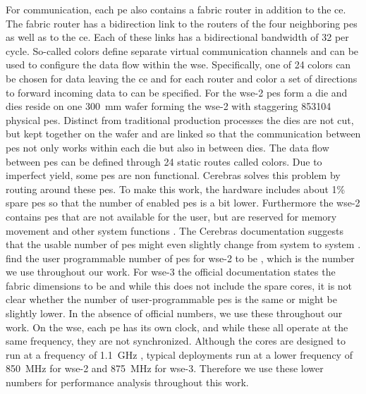 For communication, each \ac{pe} also contains a fabric router in addition to the \ac{ce}. The fabric router has a bidirection link to the routers of the four neighboring \acp{pe} as well as to the \ac{ce}. Each of these links has a bidirectional bandwidth of \qty{32}{\bit} per cycle. So-called colors define separate virtual communication channels and can be used to configure the data flow within the \ac{wse}. Specifically, one of 24 colors can be chosen for data leaving the \ac{ce} and for each router and color a set of directions to forward incoming data to can be specified. For the \ac{wse}-2  \acp{pe} form a die and  dies reside on one \qty{300}{\mm} wafer forming the \ac{wse}-2 with staggering \num{853104} physical \acp{pe}. Distinct from traditional production processes the dies are not cut, but kept together on the wafer and are linked so that the communication between \acp{pe} not only works within each die but also in between dies.
The data flow between \acp{pe} can be defined through 24 static routes called colors.\cite{lie2023cerebras}
Due to imperfect yield, some \acp{pe} are non functional.
Cerebras solves this problem by routing around these \acp{pe}. 
To make this work, the hardware includes about 1\% spare \acp{pe} so that the number of enabled \acp{pe} is a bit lower. Furthermore the \ac{wse}-2 contains \acp{pe} that are not available for the user, but are reserved for memory movement and other system functions \cite{tramm2024efficient}.
The Cerebras documentation suggests that the usable number of \acp{pe} might even slightly change from system to system \cite{cerebras_gemv_tutorial}. \citeauthor{tramm2024efficient} \cite{tramm2024efficient} find the user programmable number of \acp{pe} for \ac{wse}-2 to be , which is the number we use throughout our work. For \ac{wse}-3 the official documentation states the fabric dimensions to be  and while this does not include the spare cores, it is not clear whether the number of user-programmable \acp{pe} is the same or might be slightly lower. In the absence of official numbers, we use these throughout our work. On the \ac{wse}, each \ac{pe} has its own clock, and while these all operate at the same frequency, they are not synchronized. Although the cores are designed to run at a frequency of \qty{1.1}{\giga\hertz} \cite{lie2023cerebras}, typical deployments run at a lower frequency of \qty{850}{\mega\hertz} for \ac{wse}-2 \cite{tramm2024efficient} and \qty{875}{\mega\hertz} for \ac{wse}-3. Therefore we use these lower numbers for performance analysis throughout this work.

